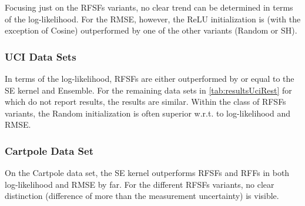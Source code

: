 		Focusing just on the \acp{RFSF} variants, no clear trend can be determined in terms of the log-likelihood.
		For the \ac{RMSE}, however, the \ac{ReLU} initialization is (with the exception of Cosine) outperformed by one of the other variants (Random or \ac{SH}).

	\subsubsection{\acs{UCI} Data Sets}
		In terms of the log-likelihood, \acp{RFSF} are either outperformed by or equal to the \ac{SE} kernel and Ensemble.
		For the remaining data sets in \cref{tab:resultsUciRest} for which\cite{watsonLatentDerivativeBayesian2021} do not report results, the results are similar.
		Within the class of \acp{RFSF} variants, the Random initialization is often superior w.r.t. to log-likelihood and \ac{RMSE}.

	\subsubsection{Cartpole Data Set}
		On the Cartpole data set, the \ac{SE} kernel outperforms \acp{RFSF} and \acp{RFF} in both log-likelihood and \ac{RMSE} by far.
		For the different \acp{RFSF} variants, no clear distinction (difference of more than the measurement uncertainty) is visible.


